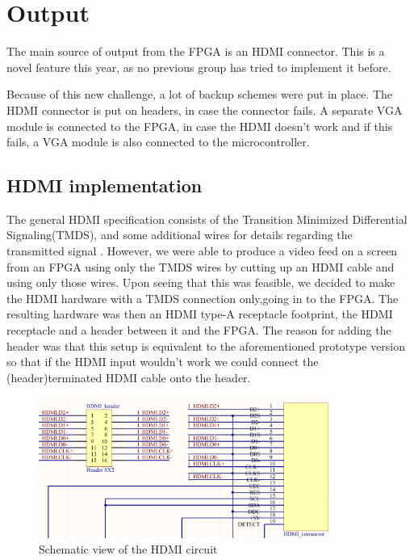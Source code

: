 \documentclass[../main/report.tex]{subfiles}
\begin{document}
\section{Output}
The main source of output from the FPGA is an HDMI connector.
This is a novel feature this year, as no previous group has tried to implement it before.

Because of this new challenge, a lot of backup schemes were put in place.
The HDMI connector is put on headers, in case the connector fails.
A separate VGA module is connected to the FPGA, in case the HDMI doesn't work and if this fails, a VGA module is also connected to the microcontroller.

\subsection{HDMI implementation}

The general HDMI specification consists of the Transition Minimized Differential Signaling(TMDS), and some additional wires for details regarding the transmitted signal .
However, we were able to produce a video feed on a screen from an FPGA using only the TMDS wires by cutting up an HDMI cable and using only those wires.
Upon seeing that this was feasible, we decided to make the HDMI hardware with a TMDS connection only,going in to the FPGA. The resulting hardware was then an HDMI type-A receptacle footprint, the HDMI receptacle and a header between it and the FPGA.
The reason for adding the header was that this setup is equivalent to the aforementioned prototype version so that if the HDMI input wouldn't work we could connect the (header)terminated HDMI cable onto the header.

\begin{figure}[H]
	\centering
	\includegraphics[width=0.85\textwidth]{../pcb/assets/HDMI-schematic.png}
	\caption{Schematic view of the HDMI circuit}
	\label{fig: HDMI schematic}
\end{figure}
\end{document}
